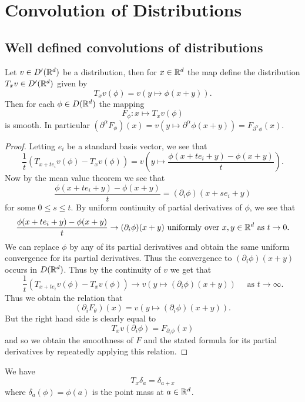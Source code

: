 \documentclass[twoside, a4paper, 10pt]{amsart}
\begin{document}
\section{Convolution of Distributions}

\subsection{Well defined convolutions of distributions}

\begin{lemma}\label{lemma: translated distribution} Let $v \in D'(\mathbb{R}^d)$ be a distribution, then for $x \in \mathbb{R}^d$ the map define the distribution $T_x v \in D'(\mathbb{R}^d)$ given by $$T_x v (\phi) = v(y \mapsto \phi(x+y)).$$ Then for each $\phi \in D(\mathbb{R}^d)$ the mapping $$F_{\phi} : x \mapsto T_x v(\phi)$$ is smooth. In particular $(\partial^{\alpha}F_{\phi})(x) = v(y \mapsto \partial^{\alpha}\phi(x+y)) = F_{\partial^{\alpha} \phi}(x).$

\end{lemma}

\begin{proof} Letting $e_i$ be a standard basis vector, we see that $$\frac{1}{t} (T_{x+t e_i}v (\phi) - T_{x}v(\phi)) = v\left( y \mapsto \frac{\phi(x+te_i + y) - \phi(x+y)}{t} \right).$$ Now by the mean value theorem we see that  $$\frac{\phi(x+te_i + y) - \phi(x+y)}{t} = (\partial_i\phi)(x+ s e_i+y)$$ for some $0 \leq s \leq t$. By uniform continuity of partial derivatives of $\phi$, we see that $$\frac{\phi(x+te_i + y) - \phi(x+y)}{t} \to (\partial_i \phi)(x+y) \text{ uniformly over } x,y \in \mathbb{R}^d \text{ as } t \to 0.$$ We can replace $\phi$ by any of its partial derivatives and obtain the same uniform convergence for its partial derivatives. Thus the convergence to $(\partial_i \phi)(x+y)$ occurs in $D(\mathbb{R}^d)$. Thus by the continuity of $v$ we get that $$\frac{1}{t} (T_{x+t e_i}v (\phi) - T_{x}v(\phi)) \to v(y \mapsto (\partial_i \phi)(x+y)) \quad \text{ as } t \to \infty.$$ Thus we obtain the relation that $$(\partial_i F_{\theta})(x) = v(y \mapsto (\partial_i\phi)(x+y)).$$ But the right hand side is clearly equal to $$T_x v(\partial_i\phi) = F_{\partial_i \phi}(x)$$ and so we obtain the smoothness of $F$ and the stated formula for its partial derivatives by repeatedly applying this relation. \end{proof}

\begin{eg} We have $$T_x \delta_a = \delta_{a+x}$$ where $\delta_a(\phi) = \phi(a)$ is the point mass at $a \in \mathbb{R}^d$.

\end{eg}
\end{document}

